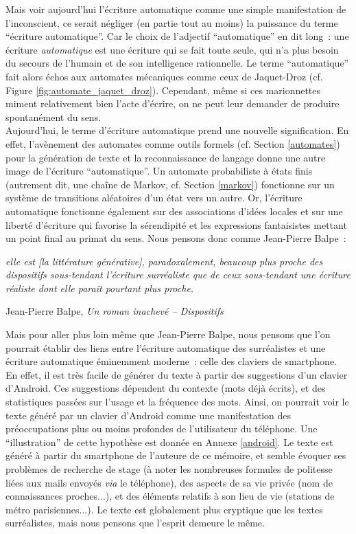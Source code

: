 \documentclass{article}
\newenvironment{citationbox}
{\begin{center}
		\begin{minipage}{.8\textwidth}
		}
		{
		\end{minipage}	
\end{center}
}
\begin{document}
				Mais voir aujourd’hui l'écriture automatique comme une simple manifestation de l'inconscient, ce serait négliger (en partie tout au moins) la puissance du terme ``écriture automatique''. Car le choix de l'adjectif ``automatique'' en dit long~: une écriture \textit{automatique} est une écriture qui se fait toute seule, qui n'a plus besoin du secours de l'humain et de son intelligence rationnelle. Le terme ``automatique'' fait alors échos aux automates mécaniques comme ceux de Jaquet-Droz (cf. Figure \ref{fig:automate_jaquet_droz}). Cependant, même si ces marionnettes miment relativement bien l'acte d'écrire, on ne peut leur demander de produire spontanément du sens.\\
				
				Aujourd'hui, le terme d'écriture automatique prend une nouvelle signification. En effet, l'avènement des automates comme outils formels (cf. Section \ref{automates}) pour la génération de texte et la reconnaissance de langage donne une autre image de l'écriture ``automatique''. Un automate probabiliste à états finis (autrement dit, une chaîne de Markov, cf. Section \ref{markov}) fonctionne sur un système de transitions aléatoires d'un état vers un autre. Or, l'écriture automatique fonctionne également sur des associations d'idées locales et sur une liberté d'écriture qui favorise la sérendipité et les expressions fantaisistes mettant un point final au primat du sens. Nous pensons donc comme Jean-Pierre Balpe~:
				\begin{citationbox}
					\textit{elle est [la littérature générative], paradoxalement, beaucoup plus proche des dispositifs sous-tendant l'écriture surréaliste que de ceux sous-tendant une écriture réaliste dont elle paraît pourtant plus proche.}\\
					\begin{flushleft}
						Jean-Pierre Balpe, \textit{Un roman inachevé -- Dispositifs}\cite{balpe1994}
					\end{flushleft}
				\end{citationbox}
				Mais pour aller plus loin même que Jean-Pierre Balpe, nous pensons que l'on pourrait établir des liens entre l'écriture automatique des surréalistes et une écriture automatique éminemment moderne~: celle des claviers de smartphone. En effet, il est très facile de générer du texte à partir des suggestions d'un clavier d'Android. Ces suggestions dépendent du contexte (mots déjà écrits), et des statistiques passées sur l'usage et la fréquence des mots. Ainsi, on pourrait voir le texte généré par un clavier d'Android comme une manifestation des préoccupations plus ou moins profondes de l'utilisateur du téléphone. Une ``illustration'' de cette hypothèse est donnée en Annexe \ref{android}. Le texte est généré à partir du smartphone de l'auteure de ce mémoire, et semble évoquer ses problèmes de recherche de stage (à noter les nombreuses formules de politesse liées aux mails envoyés \textit{via} le téléphone), des aspects de sa vie privée (nom de connaissances proches...), et des éléments relatifs à son lieu de vie (stations de métro parisiennes...). Le texte est globalement plus cryptique que les textes surréalistes, mais nous pensons que l'esprit demeure le même.\\
				
\end{document}
